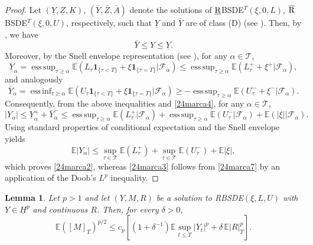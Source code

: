\documentclass[11pt,a4paper,reqno]{amsart}
\newcommand{\TT}{{\mathcal  T}}
\newcommand{\essinf}{\mathop{\mathrm{ess\,inf}}}
\newcommand{\esssup}{\mathop{\mathrm{ess\,sup}}}
\newtheorem{lemma}[theorem]{\bf Lemma}
\theoremstyle{definition}
\numberwithin{equation}{section}
\begin{document}
\begin{proof}
Let $(\underline{Y},\underline{Z},\underline{K})$, $(\bar{Y},\bar{Z},\bar{A})$ 
denote the solutions of $\text{\underline{R}}$BSDE$^T(\xi,0,L)$, 
$\rm{\overline{R}}$BSDE$^T(\xi,0,U)$, respectively, such that 
$\underline{Y}$ and $\bar{Y}$ are of class (D) (see \cite[Theorem 2.13]{K:SPA1}). 
Then, by \cite[Proposition 2.1]{K:SPA1},  we have
\begin{equation}\label{24marca4}
\bar{Y}\le Y\le \underline{Y}.
\end{equation}
Moreover, by the Snell envelope representation (see \cite[Corollary 2.9]{K:SPA1}),
for any $\alpha\in\TT$,
\begin{equation}\label{24marca6}
\underline{Y}_{\alpha}
=\esssup_{\tau\ge\alpha}\mathbb{E}(L_{\tau}\mathbf1_{\{\tau<T\}}+\xi\mathbf1_{\{\tau=T\}}|\mathcal{F}_{\alpha})
\le \esssup_{\tau\ge\alpha}\mathbb{E}(L^+_{\tau}+\xi^+|\mathcal{F}_{\alpha}),
\end{equation}
and analogously
\[
\bar{Y}_{\alpha}=\essinf_{\tau\ge\alpha}\mathbb{E}(U_{\tau}\mathbf1_{\{\tau<T\}}
+\xi\mathbf1_{\{\tau=T\}}|\mathcal{F}_{\alpha})
\ge -\esssup_{\tau\ge\alpha}\mathbb{E}(U^-_{\tau}+\xi^-|\mathcal{F}_{\alpha}).
\]
Consequently, from the above inequalities and  \eqref{24marca4}, for any $\alpha\in\TT$,
\begin{equation}
\label{24marca7}
|Y_{\alpha}|\le \underline{Y}_{\alpha}^+
+\bar{Y}_{\alpha}^-\le \esssup_{\tau\ge\alpha}\mathbb{E}(L^+_{\tau}|\mathcal{F}_{\alpha})
+\esssup_{\tau\ge\alpha}\mathbb{E}(U^-_{\tau}|\mathcal{F}_{\alpha})+\mathbb E(|\xi||\mathcal F_\alpha).
\end{equation}
Using standard properties of conditional expectation and the Snell envelope  yields
\[
\mathbb{E}|Y_{\alpha}|\le \sup_{\tau\in\TT}\mathbb{E}(L^+_{\tau})+ \sup_{\tau\in\TT}\mathbb{E}(U^-_{\tau})+\mathbb E|\xi|,
\]
which proves \eqref{24marca2}, whereas  \eqref{24marca3} follows from \eqref{24marca7} by an  application 
of the Doob's $L^p$ inequality.
\end{proof}

\begin{lemma}\label{lem.ZR.var}
Let $p>1$ and let $(Y,M,R)$ be a solution to RBSDE$(\xi,L,U)$ with
$Y\in\underline H^p$ and continuous $R$.
Then, for every $\delta>0$, 
\[
\mathbb E\left([M]_T\right)^{p/2}
\le
c_p\left[
(1+\delta^{-1})\mathbb E\sup_{t\le T}|Y_t|^p
+\delta\,\mathbb E|R|_T^p
\right].
\]
\end{lemma}
\end{document}
